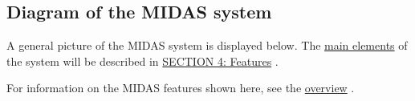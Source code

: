 \label{index_end}
\hypertarget{index_end}{}
 \subsection{Diagram of the MIDAS system}\label{I_Midas_system_picture}
\par
 

\par


\label{I_Midas_system_picture_idx_midas_overview}
\hypertarget{I_Midas_system_picture_idx_midas_overview}{}
 A general picture of the MIDAS system is displayed below. The \hyperlink{F_MainElements}{main elements} of the system will be described in \hyperlink{Features}{SECTION 4: Features} .

\begin{center}  \end{center} 

For information on the MIDAS features shown here, see the \hyperlink{F_MainElements}{overview} . \label{index_end}
\hypertarget{index_end}{}


\par
  \par
 